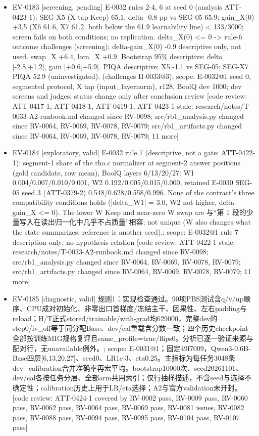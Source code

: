 \documentclass[11pt]{article}
\begin{document}
\begin{itemize}
\item EV-0183 [screening, pending] E-0032 rules 2-4, 6 at seed 0 (analysis ATT-0423-1): SEG-X5 (X tap Keep) 65.1, delta -0.8 pp vs SEG-05 65.9; gain\_X(0) +3.5 (X6 61.6, X7 61.2, both below the 61.9 learnability line) \textless{} 133/3000; screen fails on both conditions; no replication. delta\_X(0) \textless{}= 0 -\textgreater{} rule-6 outcome challenges (screening); delta-gain\_X(0) -0.9 descriptive only, not used. swap\_X +6.4, lora\_X +0.9. Bootstrap 95\% descriptive: delta [-2.8,+1.2], gain [+0.6,+5.9]. PIQA descriptive: X5 -1.1 vs SEG-05; SEG-X7 PIQA 52.9 (uninvestigated). (challenges H-0033@3); scope: E-0032@1 seed 0, segmented protocol, X tap (input\_layernorm), r128, BoolQ dev 1000; dev screens and judges; status change only after conclusion review [code review: ATT-0417-1, ATT-0418-1, ATT-0419-1, ATT-0423-1 stale: research/notes/T-0033-A2-runbook.md changed since RV-0098; src/rb1\_analysis.py changed since RV-0064, RV-0069, RV-0078, RV-0079; src/rb1\_artifacts.py changed since RV-0064, RV-0069, RV-0078, RV-0079; 11 more]
\item EV-0184 [exploratory, valid] E-0032 rule 7 (descriptive, not a gate; ATT-0422-1): segment-1 share of the rho.c normalizer at segment-2 answer positions (gold candidate, row mean), BoolQ layers 6/13/20/27: W1 0.004/0.007/0.010/0.001, W2 0.192/0.005/0.015/0.000, retained E-0030 SEG-05 seed 3 (ATT-0379-2) 0.548/0.628/0.558/0.996. None of the contract's three compatibility conditions holds (|delta\_W1| = 3.0, W2 not higher, delta-gain\_X \textless{}= 0). The lower W Keep and near-zero W swap are 与``第 1 段的少量写入在读出归一化中几乎不占质量''相容; not unique (W also changes what the state summarizes; reference is another seed).; scope: E-0032@1 rule 7 description only; no hypothesis relation [code review: ATT-0422-1 stale: research/notes/T-0033-A2-runbook.md changed since RV-0098; src/rb1\_analysis.py changed since RV-0064, RV-0069, RV-0078, RV-0079; src/rb1\_artifacts.py changed since RV-0064, RV-0069, RV-0078, RV-0079; 11 more]
\item EV-0185 [diagnostic, valid] 规则1：实现检查通过。90项PBS测试含q/v/up顺序、CPU成对初始化、非零出口首梯度/冻结主干、因果性、左右padding与reload；H/T正式stored/trainable/with-grad均629000，完整dev的step0/iv\_off等于同分配Base、dev/cal重载含分数一致；四个历史checkpoint全部按训练MIG规格复评且same\_profile=true/flips0。分析已逐一验证来源与配对行，无unavailable例外。; scope: E-0031@1；固定49f7009，Qwen3-0.6B-Base四层[6,13,20,27]、seed0、LR1e-3、eta0.25。主指标为每任务3048条dev+calibration合并准确率再宏平均。bootstrap10000次、seed20261101、dev/cal各按任务分层、全部arm共用索引；仅行抽样描述，不含seed与选择不确定性；calibration历史上用于LR/eta选择；A2与官方validation未开封。 [code review: ATT-0424-1 covered by RV-0002 pass, RV-0009 pass, RV-0060 pass, RV-0062 pass, RV-0064 pass, RV-0069 pass, RV-0081 issues, RV-0082 pass, RV-0088 pass, RV-0094 pass, RV-0095 pass, RV-0104 pass, RV-0107 pass]

\end{itemize}
\end{document}
